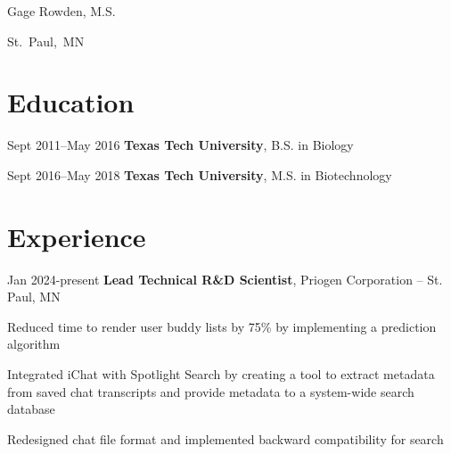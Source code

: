 \documentclass{resume}
\begin{document}
    
    \newsavebox\ANDbox
    \sbox\ANDbox{$|$}

    \begin{header}
        \fontsize{25 pt}{25 pt}\selectfont Gage Rowden, M.S.

        \vspace{5 pt}

        \normalsize
        \mbox{St. Paul, MN}%
        \AND%
        \mbox{}%
        \AND%
        \mbox{}%
        \AND%
        \mbox{}%
        \AND%
        \mbox{}%
    \end{header}

    \vspace{5 pt - 0.3 cm}

    \section{Education}
        \begin{twocolentry}{
            Sept 2011--May 2016
        }
            \textbf{Texas Tech University}, B.S. in Biology
        \end{twocolentry}

        \begin{twocolentry}{
            Sept 2016--May 2018
        }
            \textbf{Texas Tech University}, M.S. in Biotechnology
        \end{twocolentry}

    \section{Experience}



        
        \begin{twocolentry}{
            Jan 2024-present
        }
            \textbf{Lead Technical R\&D Scientist}, Priogen Corporation -- St. Paul, MN
        \end{twocolentry}

        \vspace{0.10 cm}
        \begin{onecolentry}
            \begin{highlights}
                \item Reduced time to render user buddy lists by 75\% by implementing a prediction algorithm
                \item Integrated iChat with Spotlight Search by creating a tool to extract metadata from saved chat transcripts and provide metadata to a system-wide search database
                \item Redesigned chat file format and implemented backward compatibility for search
            \end{highlights}
        \end{onecolentry}
\end{document}
